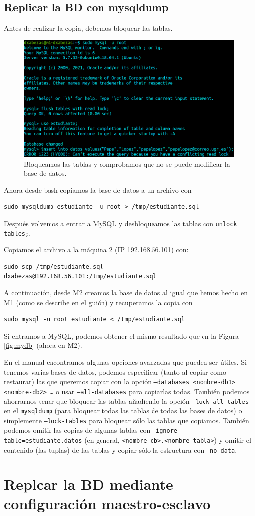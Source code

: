 \documentclass{article}
\begin{document}
\subsection{Replicar la BD con mysqldump}

Antes de realizar la copia, debemos bloquear las tablas.

\begin{figure}[H]
	\centering
	\includegraphics[width=150mm]{imgs/lock}
	\caption{Bloqueamos las tablas y comprobamos que no se puede modificar la base de datos.}
	\label{fig:lock}
\end{figure}

Ahora desde bash copiamos la base de datos a un archivo con
\begin{Verbatim}
sudo mysqldump estudiante -u root > /tmp/estudiante.sql
\end{Verbatim}
Después volvemos a entrar a MySQL y desbloqueamos las tablas con \verb|unlock tables;|. 

Copiamos el archivo a la máquina 2 (IP 192.168.56.101) con:
\begin{Verbatim}
sudo scp /tmp/estudiante.sql dxabezas@192.168.56.101:/tmp/estudiante.sql
\end{Verbatim}

A continuación, desde M2 creamos la base de datos al igual que hemos hecho en M1 (como se describe en el guión) y recuperamos
la copia con 
\begin{Verbatim}
sudo mysql -u root estudiante < /tmp/estudiante.sql
\end{Verbatim}
Si entramos a MySQL, podemos obtener el mismo resultado que en la Figura \ref{fig:mydb} (ahora en M2).

En el manual encontramos algunas opciones avanzadas que pueden ser útiles. Si tenemos varias bases de datos, podemos especificar
(tanto al copiar como restaurar)
las que queremos copiar con la opción \texttt{--databases <nombre-db1> <nombre-db2> \ldots} o usar \texttt{--all-databases} para
copiarlas todas. También podemos ahorrarnos tener que bloquear las tablas añadiendo la opción \texttt{--lock-all-tables} en el
\texttt{mysqldump} (para bloquear todas las tablas de todas las bases de datos) o simplemente \texttt{--lock-tables} para bloquear
sólo las tablas que copiamos. También podemos omitir las copias de algunas tablas con \texttt{--ignore-table=estudiante.datos} (en general, \texttt{<nombre db>.<nombre tabla>}) y omitir el contenido (las tuplas) de las tablas y copiar sólo la estructura con \texttt{--no-data}.

\section{Replcar la BD mediante configuración maestro-esclavo}
\end{document}
